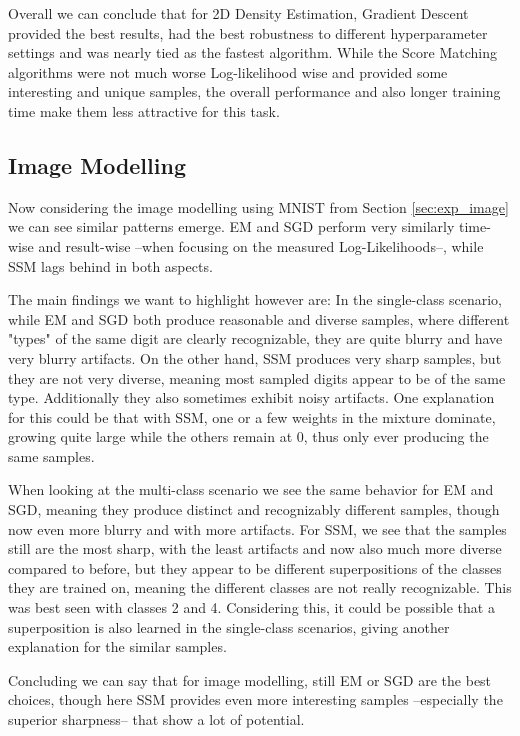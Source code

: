 Overall we can conclude that for 2D Density Estimation, Gradient Descent provided the best results, had the best robustness to 
different hyperparameter settings and was nearly tied as the fastest algorithm. 
While the Score Matching algorithms were not much worse Log-likelihood wise and provided some interesting and unique samples,
the overall performance and also longer training time make them less attractive for this task. \\

\subsection{Image Modelling}

Now considering the image modelling using MNIST from Section \ref{sec:exp_image} 
we can see similar patterns emerge. EM and SGD perform very similarly time-wise and 
result-wise --when focusing on the measured Log-Likelihoods--, while SSM lags behind in both aspects.

The main findings we want to highlight however are: In the single-class scenario, while EM and SGD both produce reasonable 
and diverse samples, where different "types" of the same digit are clearly recognizable, they are quite blurry and have very blurry artifacts. On the other 
hand, SSM produces very sharp samples, but they are not very diverse, meaning most sampled digits appear to be of the same type. Additionally they also sometimes exhibit noisy artifacts.
One explanation for this could be that with SSM, one or a few weights in the mixture dominate, 
growing quite large while the others remain at $0$, thus only ever producing the same samples.

When looking at the multi-class scenario we see the same behavior for EM and SGD, meaning 
they produce distinct and recognizably different samples, though now even more blurry and with more
artifacts. For SSM, we see that the samples still are the most sharp, with the least artifacts
and now also much more diverse compared to before, but they appear to be different superpositions 
of the classes they are trained on, meaning the different classes are not really 
recognizable. This was best seen with classes 2 and 4.
Considering this, it could be possible that a superposition is also
learned in the single-class scenarios, giving another explanation for the similar samples.

Concluding we can say that for image modelling, still EM or SGD are the best choices, 
though here SSM provides even more interesting samples --especially the superior sharpness-- that show a lot of potential.


